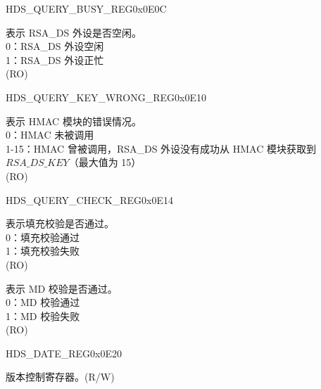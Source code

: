 \begin{register}{H}{DS\_QUERY\_BUSY\_REG}{0x0E0C}\label{regdesc:DSQUERYBUSYREG}
%
%
\regnewline%
\begin{regdesc}\begin{reglist}
\item [DS\_QUERY\_BUSY] 表示 RSA\_DS 外设是否空闲。\\
0：RSA\_DS 外设空闲\\
1：RSA\_DS 外设正忙\\
(RO)
\end{reglist}\end{regdesc}
\end{register}



\begin{register}{H}{DS\_QUERY\_KEY\_WRONG\_REG}{0x0E10}\label{regdesc:DSQUERYKEYWRONGREG}
%
%
\regnewline%
\begin{regdesc}\begin{reglist}
\item [DS\_QUERY\_KEY\_WRONG] 表示 HMAC 模块的错误情况。\\
0：HMAC 未被调用\\
1-15：HMAC 曾被调用，RSA\_DS 外设没有成功从 HMAC 模块获取到 \begin{math}RSA\_DS\_KEY\end{math}（最大值为 15）\\
(RO)
\end{reglist}\end{regdesc}
\end{register}




\begin{register}{H}{DS\_QUERY\_CHECK\_REG}{0x0E14}\label{regdesc:DSQUERYCHECKREG}
%
%
%
\regnewline%
\begin{regdesc}\begin{reglist}
\item [DS\_PADDING\_BAD] 表示填充校验是否通过。\\ 0：填充校验通过\\
1：填充校验失败\\
(RO)
\item [DS\_MD\_ERROR] 表示 MD 校验是否通过。\\
0：MD 校验通过\\
1：MD 校验失败\\
(RO)
\end{reglist}\end{regdesc}
\end{register}




\begin{register}{H}{DS\_DATE\_REG}{0x0E20}\label{regdesc:DSDATEREG}
%
%
\regnewline%
\begin{regdesc}\begin{reglist}
\item [DS\_DATE] 版本控制寄存器。(R/W)
\end{reglist}\end{regdesc}
\end{register}
